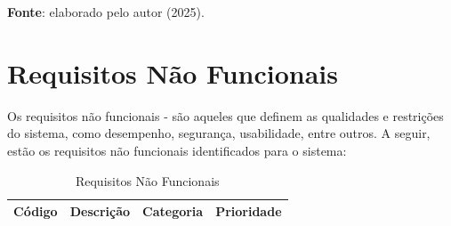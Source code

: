 \begin{center}
    \small{\textbf{Fonte}: elaborado pelo autor (2025).}
\end{center}


\section{Requisitos Não Funcionais}

Os requisitos não funcionais -  são aqueles que definem as qualidades e restrições do sistema, como desempenho, segurança, usabilidade, entre outros. A seguir, estão os requisitos não funcionais identificados para o sistema:
\begin{longtable}[c]{|l|l|l|l|}
\caption{Requisitos Não Funcionais}
\label{tab:reqs-nao-funcionais}\\
\hline
\textbf{Código} & \textbf{Descrição}                                                                        & \textbf{Categoria} & \textbf{Prioridade} \\ \hline
\endfirsthead
\endhead


\end{longtable}
